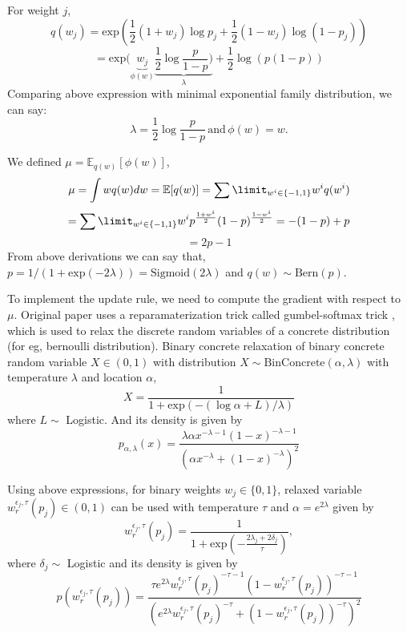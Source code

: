 For weight $j$, \[q(w_j) = \mathrm{exp}(\frac{1}{2}(1+w_j)\log p_j + \frac{1}{2}(1-w_j)\log(1-p_j))\] \[ = \mathrm{exp}(\underbrace{w_j}_{\phi(w)}\underbrace{\frac{1}{2}\log\frac{p}{1-p})}_{\lambda} + \frac{1}{2}\log(p(1-p))\]
Comparing above expression with minimal exponential family distribution, we can say:
\[\lambda = \frac{1}{2}\log\frac{p}{1-p} \, \mathrm{and} \, \phi(w) = w.\]

We defined $\mu = \mathbb{E}_{q(w)}[\phi(w)]$,
\[\mu = \int wq(w)dw = \mathbb{E}[q(w)] = \sum\limit_{w^{i}\in\{-1,1\}}w^{i} q(w^{i}) \] \[= \sum\limit_{w^{i}\in\{-1,1\}}w^{i} p^{\frac{1+w^{i}}{2}}(1-p)^{\frac{1-w^{i}}{2}} = -(1-p) + p\]
\[= 2p-1\]
From above derivations we can say that, $p = 1/(1 + \mathrm{exp}(-2\lambda)) = \mathrm{Sigmoid}(2\lambda)$ and $q(w) \sim \mathrm{Bern}(p)$.

To implement the update rule, we need to compute the gradient with respect to $\mu$. Original paper uses a reparamaterization trick called  gumbel-softmax trick \citet{r7}, which is used to relax the discrete random variables of a concrete distribution (for eg, bernoulli distribution).  Binary concrete relaxation \citet{r7} of binary concrete random variable $X \in (0,1)$ with distribution $X \sim \mathrm{BinConcrete}(\alpha, \lambda)$ with temperature $\lambda$ and location $\alpha $, \[X = \frac{1}{1 + \mathrm{exp}(-(\log\alpha + L)/\lambda)}\] where $L \sim $ Logistic. And its density is given by \[p_{\alpha,\lambda}(x) = \frac{\lambda\alpha x^{-\lambda-1}(1-x)^{-\lambda-1}}{(\alpha x^{-\lambda} + (1-x)^{-\lambda})^{2}}\]

Using above expressions, for binary weights $w_j \in \{0,1\}$, relaxed variable $w_{r}^{\epsilon_{j}, \tau}(p_j) \in (0,1)$ can be used with temperature $\tau$ and $\alpha = e^{2\lambda}$ given by \[ w_{r}^{\epsilon_{j}, \tau}(p_j) = \frac{1}{1 + \mathrm{exp}(-\frac{2\lambda_j + 2\delta_j}{\tau})},\] where $\delta_j \sim$ Logistic and its density is given by \[p(w_{r}^{\epsilon_{j}, \tau}(p_j)) = \frac{\tau e^{2\lambda} w_{r}^{\epsilon_{j}, \tau}(p_j)^{-\tau-1}(1-w_{r}^{\epsilon_{j}, \tau}(p_j))^{-\tau-1}}{(e^{2\lambda} w_{r}^{\epsilon_{j}, \tau}(p_j)^{-\tau} + (1-w_{r}^{\epsilon_{j}, \tau}(p_j))^{-\tau})^{2}}\]